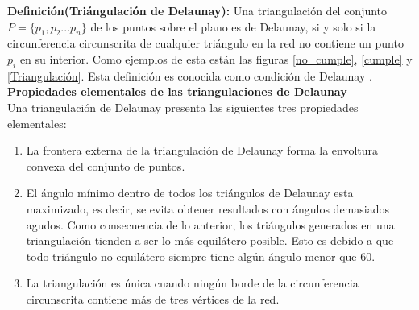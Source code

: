 \documentclass[12pt]{report}
\begin{document}
\textbf{Definición(Triángulación de Delaunay):} Una triangulación del conjunto $P=\{p_1,p_2 ... p_n\}$ de los puntos sobre el plano es de Delaunay, si y solo si la circunferencia circunscrita de cualquier triángulo en la red no contiene un punto $p_i$ en su interior. Como ejemplos de esta están las figuras \ref{no_cumple}, \ref{cumple} y \ref{Triangulación}. Esta definición es conocida como condición de Delaunay \cite{26,27,28}.\\    

		{\large{\textbf{Propiedades elementales de las triangulaciones de Delaunay}}}\\

	Una triangulación de Delaunay presenta las siguientes tres propiedades elementales:
	
	\begin{enumerate}
		\item La frontera externa de la triangulación de Delaunay forma la envoltura convexa del conjunto de puntos.
		\item El ángulo mínimo dentro de todos los triángulos de Delaunay esta maximizado, es decir, se evita obtener resultados con ángulos demasiados agudos. Como consecuencia de lo anterior, los triángulos generados en una triangulación tienden a ser lo más equilátero posible. Esto  es debido a que todo triángulo no equilátero siempre tiene algún ángulo menor que 60{\degree }.
		\item La triangulación es única cuando ningún borde de la circunferencia circunscrita contiene más de tres vértices de la red. 
	
	\end{enumerate}
		
\end{document}
